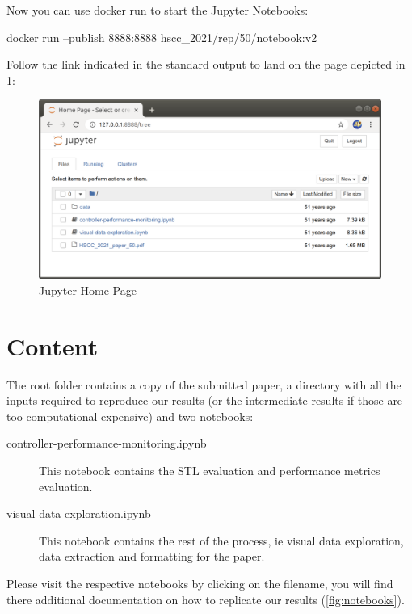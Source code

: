 \documentclass{uLatex}
\begin{document}
Now you can use docker run\cite{docker-run} to start the Jupyter Notebooks:
\begin{bashshell}
docker run --publish 8888:8888 hscc_2021/rep/50/notebook:v2
\end{bashshell}
Follow the link indicated in the standard output to land on the page depicted in \cref{fig:jupyter}:
\begin{figure}[h!]
    \centering
    \includegraphics[width=\textwidth]{jupyter}
    \caption{Jupyter Home Page}
    \label{fig:jupyter}
\end{figure}

\section{Content}

The root folder contains a copy of the submitted paper, a  directory with all the inputs required to reproduce our results (or the intermediate results if those are too computational expensive) and two notebooks:
\begin{description}
\item[controller-performance-monitoring.ipynb] This notebook contains the STL evaluation and performance metrics evaluation.
\item[visual-data-exploration.ipynb] This notebook contains the rest of the process, ie visual data exploration,
data extraction and formatting for the paper.
\end{description}

Please visit the respective notebooks by clicking on the filename, you will find there additional documentation on how to replicate our results (\cref{fig:notebooks}).
\end{document}
